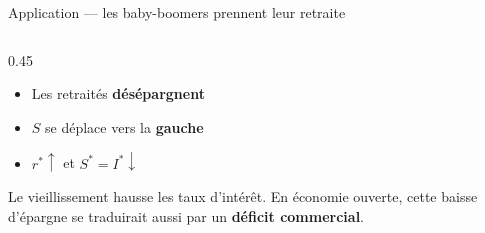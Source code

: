 \documentclass[aspectratio=169]{beamer}
\begin{document}
\begin{frame}[t]{Application --- les baby-boomers prennent leur retraite}
\begin{columns}[T]
\begin{column}{0.45\textwidth}
         \begin{itemize}
            \setlength\itemsep{0.15cm}
            \item Les retraités \textbf{désépargnent}
            \item $S$ se déplace vers la \textbf{gauche}
            \item $r^* \uparrow$ et $S^* = I^* \downarrow$
         \end{itemize}
         \vspace{0.2cm}
         \begin{keyinsight}
            Le vieillissement hausse les taux d'intérêt. En économie ouverte, cette baisse d'épargne se traduirait aussi par un \textbf{déficit commercial}.
         \end{keyinsight}
      \end{column}
   \end{columns}
\end{frame}
\end{document}
